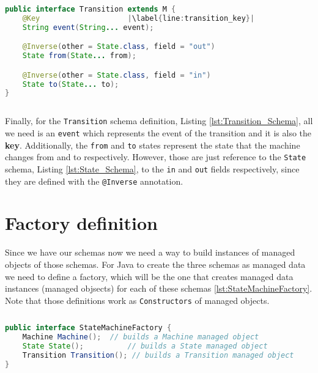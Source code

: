 \begin{sourcecode}[H]
	\begin{lstlisting}[language=Java,escapechar=|]
public interface Transition extends M {
	@Key 					|\label{line:transition_key}| 
	String event(String... event);

	@Inverse(other = State.class, field = "out")
	State from(State... from);

	@Inverse(other = State.class, field = "in")
	State to(State... to);
}
	\end{lstlisting}
	\caption{The Transition Schema}
	\label{lst:Transition_Schema}
\end{sourcecode}

Finally, for the \texttt{Transition} schema definition, Listing \ref{lst:Transition_Schema}, all we need is an \texttt{event} which represents the event of the transition and it is also the \textbf{key}.
Additionally, the \texttt{from} and \texttt{to} states represent the state that the machine changes from and to respectively.
However, those are just reference to the \texttt{State} schema, Listing \ref{lst:State_Schema}, to the \texttt{in} and \texttt{out} fields respectively, since they are defined with the \texttt{@Inverse} annotation.

\section{Factory definition}
Since we have our schemas now we need a way to build instances of managed objects of those schemas. 
For Java to create the three schemas as managed data we need to define a factory, which will be the one that creates managed data instances (managed objsects) for each of these schemas \ref{lst:StateMachineFactory}.
Note that those definitions work as \texttt{Constructors} of managed objects.

\begin{sourcecode}[H]
	\begin{lstlisting}[language=Java,escapechar=|]
public interface StateMachineFactory {
	Machine Machine();  // builds a Machine managed object
	State State(); 			// builds a State managed object
	Transition Transition(); // builds a Transition managed object
}
	\end{lstlisting}
	\caption{The StateMachine Factory}
	\label{lst:StateMachineFactory}
\end{sourcecode}

